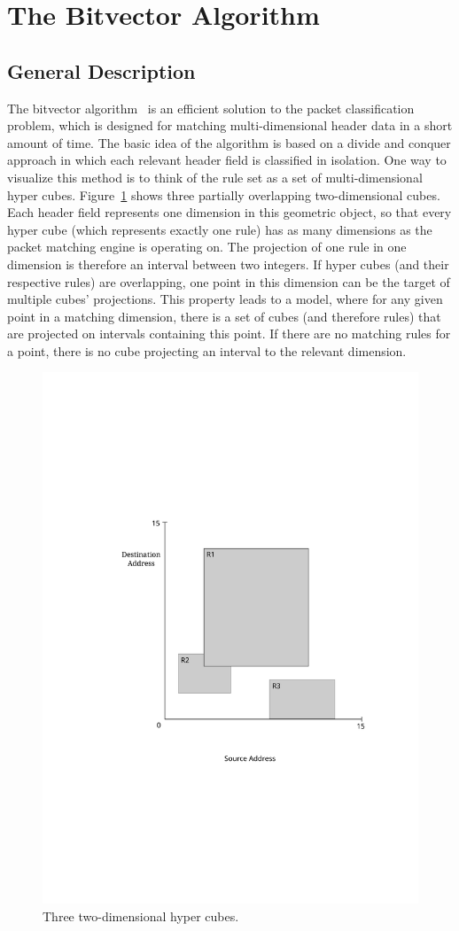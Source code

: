 \documentclass[conference]{IEEEtran}
\begin{document}
\section{The Bitvector Algorithm}
\subsection{General Description}
\label{sec:bv-general}
The bitvector algorithm~\cite{bv} is an efficient solution to the packet 
classification problem, which is designed for matching multi-dimensional header data in a short amount of time.
The basic idea of the algorithm is based on a divide and conquer approach in 
which each relevant header field is classified in isolation.
One way to visualize this method is to think of the rule set as a set of multi-dimensional hyper cubes.
Figure~\ref{fig:cubes} shows three partially overlapping two-dimensional cubes.
Each header field represents one dimension in this geometric object, so 
that every hyper cube (which represents exactly one rule) has as many dimensions as the packet matching engine is operating on.
The projection of one rule in one dimension is therefore an interval between two integers.
If hyper cubes (and their respective rules) are overlapping, one point in this dimension can be the target of multiple cubes' projections. 
This property leads to a model, where for any given point in a matching
dimension, there is a set of cubes (and therefore rules) that are projected on intervals containing this point.
If there are no matching rules for a point, there is no cube projecting an interval to the relevant dimension.

\begin{figure}
    \centering
    \includegraphics[width=0.8\linewidth]{images/hypercubes}
    \caption{Three two-dimensional hyper cubes.}
    \label{fig:cubes}
\end{figure}
\end{document}
